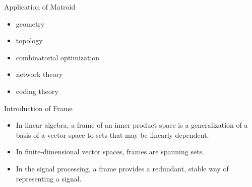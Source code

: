 \documentclass{beamer}
\begin{document}

\begin{frame}{Application of Matroid}

\begin{itemize}
    \item geometry
    \item topology
    \item combinatorial optimization
    \item network theory
    \item coding theory
    \\
    \cite{neel2009matroids}
    \cite{kashyap2009applications}
\end{itemize}
    
\end{frame}


\begin{frame}{Introduction of Frame}
  \begin{itemize}
    
    \item In linear algebra, a frame of an inner product space is a generalization of a basis of a vector space to sets that may be linearly dependent.\cite{kovavcevic2008introduction}
    
    \item In finite-dimensional vector spaces, frames are spanning sets.
    \item In the signal processing, a frame provides a redundant, stable way of representing a signal.\cite{goyal2001quantized}
    
  \end{itemize}
\end{frame}
\end{document}
